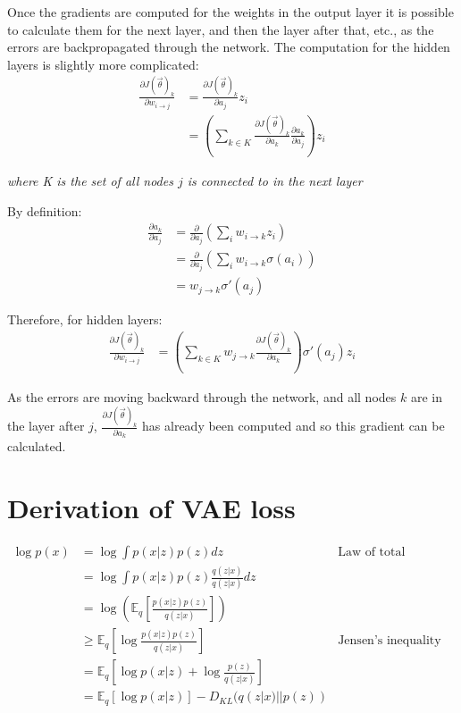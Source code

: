 Once the gradients are computed for the weights in the output layer it is possible to calculate them for the next layer, and then the
layer after that, etc., as the errors are backpropagated through the network. The computation for the hidden layers is slightly more 
complicated:
\begin{align}
  \frac{\partial J(\vec{\theta})_k}{\partial w_{i \to j}} & = \frac{\partial J(\vec{\theta})_k}{\partial a_j} z_i \\
  & = \left( \sum_{k \in K} \frac{\partial J(\vec{\theta})_k}{\partial a_k} \frac{\partial a_k}{\partial a_j} \right) z_i
\end{align}
\begin{center}
  \textit{where K is the set of all nodes $j$ is connected to in the next layer}
\end{center}

By definition:
\begin{align}
  \frac{\partial a_k}{\partial a_j} & = \frac{\partial}{\partial a_j} \left( \sum_{i} w_{i \to k} z_i \right) \\
  & = \frac{\partial}{\partial a_j} \left( \sum_{i} w_{i \to k} \sigma(a_i) \right) \\
  & = w_{j \to k} \sigma'(a_j)
\end{align}

Therefore, for hidden layers:
\begin{align}
  \frac{\partial J(\vec{\theta})_k}{\partial w_{i \to j}} & = \left( \sum_{k \in K} w_{j \to k} \frac{\partial J(\vec{\theta})_k}{\partial a_k} \right) \sigma'(a_j) z_i
\end{align}

As the errors are moving backward through the network, and all nodes $k$ are in the layer after $j$, $\frac{\partial J(\vec{\theta})_k}{\partial a_k}$
has already been computed and so this gradient can be calculated.

\chapter{Derivation of VAE loss} \label{vae_loss}

\begin{align}
  \log p(x) & = \log \int p(x|z)p(z) dz &\text{Law of total probability}\\
  & = \log \int p(x|z)p(z) \frac{q(z|x)}{q(z|x)} dz\\
  & = \log\left(\mathbb{E}_q \left[\frac{p(x|z)p(z)}{q(z|x)}\right]\right) \\
  & \geq \mathbb{E}_q \left[\log\frac{p(x|z)p(z)}{q(z|x)}\right] &\text{Jensen's inequality}\\
  & = \mathbb{E}_q \left[\log p(x|z) + \log\frac{p(z)}{q(z|x)}\right] \\
  & = \mathbb{E}_q [\log p(x|z)] - D_{KL}(q(z|x)||p(z))
\end{align}

